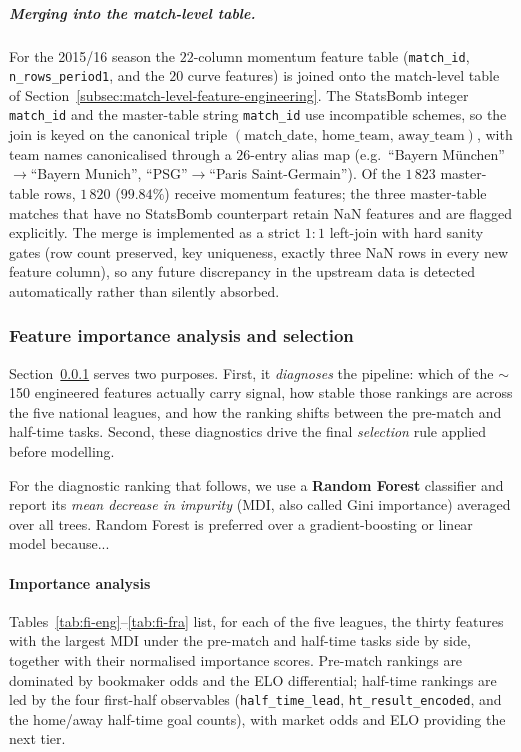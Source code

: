 \documentclass[pdflatex,sn-mathphys-num]{sn-jnl}
\theoremstyle{thmstyleone}
\theoremstyle{thmstyletwo}
\theoremstyle{thmstylethree}
\begin{document}
\subparagraph{Merging into the match-level table.}
For the 2015/16 season the $22$-column momentum feature table
(\texttt{match\_id}, \texttt{n\_rows\_period1}, and the $20$ curve
features) is joined onto the match-level table of
Section~\ref{subsec:match-level-feature-engineering}. The StatsBomb
integer \texttt{match\_id} and the master-table string
\texttt{match\_id} use incompatible schemes, so the join is keyed on
the canonical triple
$(\text{match\_date},\,\text{home\_team},\,\text{away\_team})$, with
team names canonicalised through a $26$-entry alias map (e.g.\
``Bayern M\"unchen''$\to$``Bayern Munich'', ``PSG''$\to$``Paris
Saint-Germain''). Of the $1\,823$ master-table rows, $1\,820$
($99.84\%$) receive momentum features; the three master-table matches
that have no StatsBomb counterpart retain NaN features and are flagged
explicitly. The merge is implemented as a strict $1{:}1$ left-join
with hard sanity gates (row count preserved, key uniqueness, exactly
three NaN rows in every new feature column), so any future discrepancy
in the upstream data is detected automatically rather than silently
absorbed.

\subsubsection{Feature importance analysis and selection}\label{subsec:fi}

Section~\ref{subsec:fi} serves two purposes. First, it \emph{diagnoses}
the pipeline: which of the $\sim$150 engineered features actually carry
signal, how stable those rankings are across the five national leagues,
and how the ranking shifts between the pre-match and half-time tasks.
Second, these diagnostics drive the final \emph{selection} rule applied
before modelling.

For the diagnostic ranking that follows, we use a \textbf{Random
Forest} classifier and report its \emph{mean decrease in impurity}
(MDI, also called Gini importance) averaged over all trees. Random
Forest is preferred over a gradient-boosting or linear model because...

\paragraph{Importance analysis}\label{subsec:fi-analysis}

Tables~\ref{tab:fi-eng}--\ref{tab:fi-fra} list, for each of the five
leagues, the thirty features with the largest MDI under the pre-match
and half-time tasks side by side, together with their normalised
importance scores. Pre-match rankings are dominated by bookmaker odds
and the ELO differential; half-time rankings are led by the four
first-half observables (\texttt{half\_time\_lead},
\texttt{ht\_result\_encoded}, and the home/away half-time goal counts),
with market odds and ELO providing the next tier.
\end{document}
